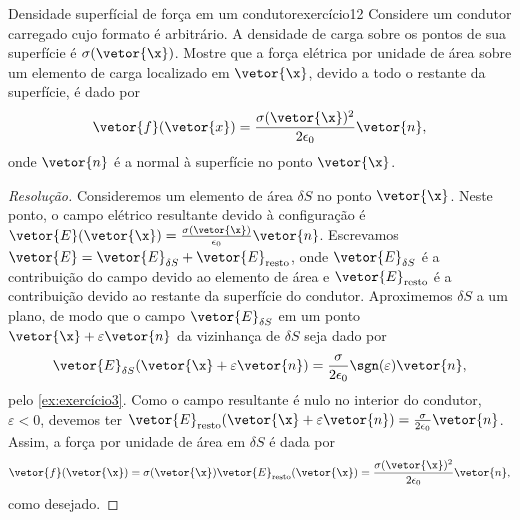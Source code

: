 \begin{exercício}{Densidade superfícial de força em um condutor}{exercício12}
    Considere um condutor carregado cujo formato é arbitrário. A densidade de carga sobre os pontos de sua superfície é \(\sigma(\vetor{\x})\). Mostre que a força elétrica por unidade de área sobre um elemento de carga localizado em \(\vetor{\x}\), devido a todo o restante da superfície, é dado por
    \begin{equation*}
        \vetor{f}(\vetor{x}) = \frac{\sigma(\vetor{\x})^2}{2 \epsilon_0}\vetor{n},
    \end{equation*}
    onde \(\vetor{n}\) é a normal à superfície no ponto \(\vetor{\x}\).
\end{exercício}
\begin{proof}[Resolução]
    Consideremos um elemento de área \(\delta S\) no ponto \(\vetor{\x}\). Neste ponto, o campo elétrico resultante devido à configuração é \(\vetor{E}(\vetor{\x}) = \frac{\sigma(\vetor{\x})}{\epsilon_0}\vetor{n}\). Escrevamos \(\vetor{E} = \vetor{E}_{\delta S} + \vetor{E}_{\mathrm{resto}}\), onde \(\vetor{E}_{\delta S}\) é a contribuição do campo devido ao elemento de área e \(\vetor{E}_\mathrm{resto}\) é a contribuição devido ao restante da superfície do condutor. Aproximemos \(\delta S\) a um plano, de modo que o campo \(\vetor{E}_{\delta S}\) em um ponto \(\vetor{\x} + \varepsilon \vetor{n}\) da vizinhança de \(\delta S\) seja dado por
    \begin{equation*}
        \vetor{E}_{\delta S}(\vetor{\x} + \varepsilon \vetor{n}) = \frac{\sigma}{2 \epsilon_0} \sgn(\varepsilon) \vetor{n},
    \end{equation*}
    pelo \cref{ex:exercício3}. Como o campo resultante é nulo no interior do condutor, \(\varepsilon < 0\), devemos ter \(\vetor{E}_\mathrm{resto}(\vetor{\x} + \varepsilon \vetor{n}) = \frac{\sigma}{2 \epsilon_0}\vetor{n}\). Assim, a força por unidade de área em \(\delta S\) é dada por
    \begin{equation*}
        \vetor{f}(\vetor{\x}) = \sigma(\vetor{\x}) \vetor{E}_\mathrm{resto}(\vetor{\x}) = \frac{\sigma(\vetor{\x})^2}{2 \epsilon_0}\vetor{n},
    \end{equation*}
    como desejado.
\end{proof}
